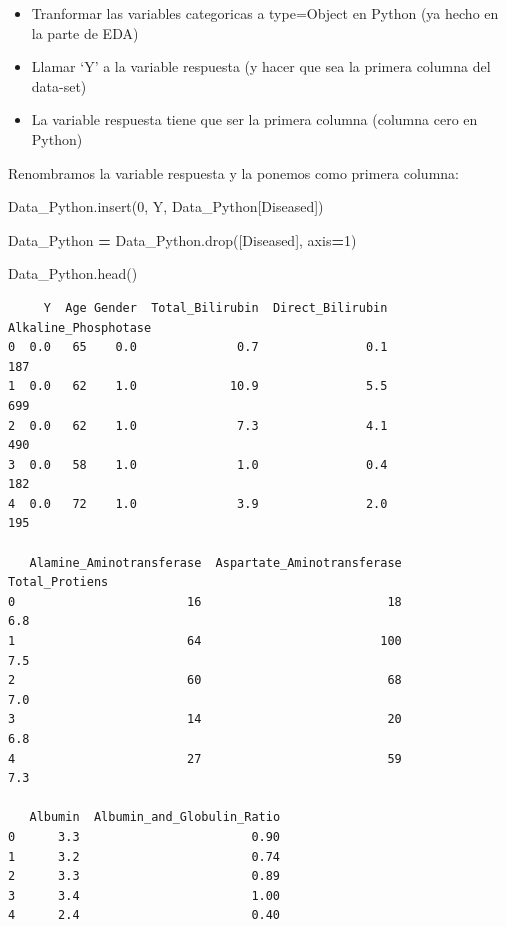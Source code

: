 \documentclass[
  11pt,
  a4paper,
]{article}
\newenvironment{Shaded}{\begin{snugshade}}{\end{snugshade}}
\newcommand{\DecValTok}[1]{\textcolor[rgb]{0.00,0.00,0.81}{#1}}
\newcommand{\NormalTok}[1]{#1}
\newcommand{\OperatorTok}[1]{\textcolor[rgb]{0.81,0.36,0.00}{\textbf{#1}}}
\newcommand{\StringTok}[1]{\textcolor[rgb]{0.31,0.60,0.02}{#1}}
\providecommand{\tightlist}{%
  \setlength{\itemsep}{0pt}\setlength{\parskip}{0pt}}
\begin{document}
\begin{itemize}
\tightlist
\item
  Tranformar las variables categoricas a type=Object en Python (ya hecho
  en la parte de EDA)
\item
  Llamar `Y' a la variable respuesta (y hacer que sea la primera columna
  del data-set)
\item
  La variable respuesta tiene que ser la primera columna (columna cero
  en Python)
\end{itemize}

Renombramos la variable respuesta y la ponemos como primera columna:

\begin{Shaded}
\begin{Highlighting}[]
\NormalTok{Data\_Python.insert(}\DecValTok{0}\NormalTok{, }\StringTok{\textquotesingle{}Y\textquotesingle{}}\NormalTok{, Data\_Python[}\StringTok{\textquotesingle{}Diseased\textquotesingle{}}\NormalTok{])}
\end{Highlighting}
\end{Shaded}

\begin{Shaded}
\begin{Highlighting}[]
\NormalTok{Data\_Python }\OperatorTok{=}\NormalTok{ Data\_Python.drop([}\StringTok{\textquotesingle{}Diseased\textquotesingle{}}\NormalTok{], axis}\OperatorTok{=}\DecValTok{1}\NormalTok{)}
\end{Highlighting}
\end{Shaded}

\newpage

\begin{Shaded}
\begin{Highlighting}[]
\NormalTok{Data\_Python.head()}
\end{Highlighting}
\end{Shaded}

\begin{verbatim}
     Y  Age Gender  Total_Bilirubin  Direct_Bilirubin  Alkaline_Phosphotase  
0  0.0   65    0.0              0.7               0.1                   187   
1  0.0   62    1.0             10.9               5.5                   699   
2  0.0   62    1.0              7.3               4.1                   490   
3  0.0   58    1.0              1.0               0.4                   182   
4  0.0   72    1.0              3.9               2.0                   195   

   Alamine_Aminotransferase  Aspartate_Aminotransferase  Total_Protiens  
0                        16                          18             6.8   
1                        64                         100             7.5   
2                        60                          68             7.0   
3                        14                          20             6.8   
4                        27                          59             7.3   

   Albumin  Albumin_and_Globulin_Ratio  
0      3.3                        0.90  
1      3.2                        0.74  
2      3.3                        0.89  
3      3.4                        1.00  
4      2.4                        0.40
\end{verbatim}
\end{document}
